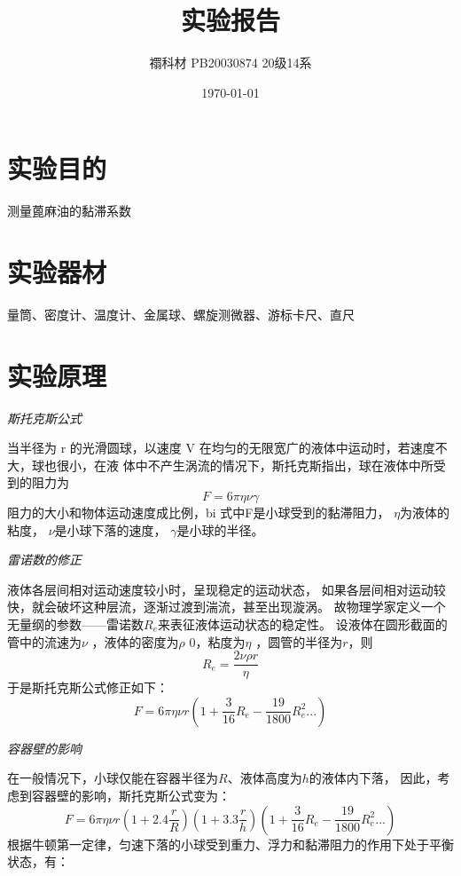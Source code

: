 \documentclass[UTF8]{ctexart}
\title{实验报告}
\author{禤科材 PB20030874 20级14系}
\date{\today}
\begin{document}
\maketitle
    
    \section{实验目的}
    测量蓖麻油的黏滞系数
    
    \section{实验器材}
    量筒、密度计、温度计、金属球、螺旋测微器、游标卡尺、直尺

    \section{实验原理}

\emph{斯托克斯公式}\cite{jiangyi}

    当半径为 r 的光滑圆球，以速度 V 在均匀的无限宽广的液体中运动时，若速度不大，球也很小，在液
体中不产生涡流的情况下，斯托克斯指出，球在液体中所受到的阻力为
\begin{equation}
    F=6\pi \eta \nu \gamma 
\end{equation}
阻力的大小和物体运动速度成比例，bi
式中F是小球受到的黏滞阻力，
$\eta$为液体的粘度，
$\nu $是小球下落的速度，
$\gamma $是小球的半径。

\emph{雷诺数的修正}\cite{jiangyi}

液体各层间相对运动速度较小时，呈现稳定的运动状态，
如果各层间相对运动较快，就会破坏这种层流，逐渐过渡到湍流，甚至出现漩涡。
故物理学家定义一个无量纲的参数——雷诺数$R_e$来表征液体运动状态的稳定性。
设液体在圆形截面的管中的流速为$\nu$ ，液体的密度为$\rho$ 0，粘度为$\eta$ ，圆管的半径为$r$，则
\begin{equation}
    R_e=\frac{2\nu \rho r}{\eta} 
\end{equation}
于是斯托克斯公式修正如下：
\begin{equation}
    F=6\pi \eta \nu r(1+\frac{3}{16}R_e-\frac{19}{1800}R_e^2...)
\end{equation}

\emph{容器壁的影响}\cite{jiangyi}

在一般情况下，小球仅能在容器半径为$R$、液体高度为$h$的液体内下落，
因此，考虑到容器壁的影响，斯托克斯公式变为：
\begin{equation}
    F=6\pi \eta \nu r(1+2.4\frac{r}{R})(1+3.3\frac{r}{h})(1+\frac{3}{16}R_e-\frac{19}{1800}R_e^2...)
\end{equation}
根据牛顿第一定律，匀速下落的小球受到重力、浮力和黏滞阻力的作用下处于平衡状态，有：
\end{document}
